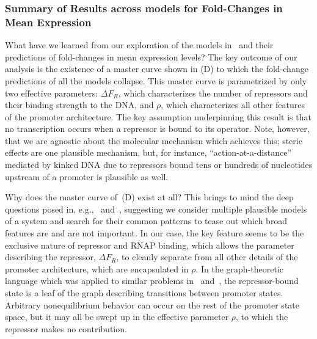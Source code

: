\subsubsection{Summary of Results across models for Fold-Changes in Mean
Expression}
What have we learned from our exploration of the models
in~ and their predictions of fold-changes in mean
expression levels? The key outcome of our analysis is the existence of a master
curve shown in (D) to which the fold-change predictions
of all the models collapse. This master curve is parametrized by only two
effective parameters: $\Delta F_R$, which characterizes the number of repressors
and their binding strength to the DNA, and $\rho$, which characterizes all other
features of the promoter architecture. The key assumption underpinning this
result is that no transcription occurs when a repressor is bound to its
operator. Note, however, that we are agnostic about the molecular mechanism
which achieves this; steric effects are one plausible mechanism, but, for
instance, ``action-at-a-distance'' mediated by kinked DNA due to repressors
bound tens or hundreds of nucleotides upstream of a promoter is plausible as
well.

Why does the master curve of~(D) exist at all?
This brings to mind the deep questions posed in,
e.g.,~\cite{Frank2013} and~\cite{Frank2014a}, suggesting we consider multiple
plausible models of a system and search for their common patterns to tease
out which broad features are and are not important.
In our case, the key feature seems to be the
exclusive nature of repressor and RNAP binding, which allows the parameter
describing the repressor, $\Delta F_R$, to cleanly separate from all other
details of the promoter architecture, which are encapsulated in $\rho$. In the
graph-theoretic language which was applied to similar problems
in~\cite{Gunawardena2012} and~\cite{Ahsendorf2014}, the repressor-bound state is
a leaf of the graph describing transitions between promoter states. Arbitrary
nonequilibrium behavior can occur on the rest of the promoter state space, but
it may all be swept up in the effective parameter $\rho$, to which the repressor
makes no contribution.

